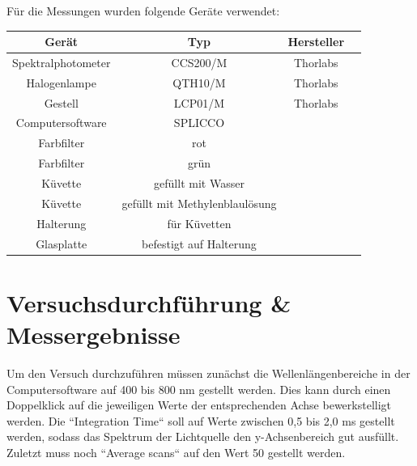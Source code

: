 \documentclass[11pt,ngerman]{scrartcl}
\begin{document}
\noindent Für die Messungen wurden folgende Geräte verwendet:

\begin{table}[H]
	\begin{center}
		\begin{tabular}{|c|c|c|c|} \hline
			\textbf{Gerät}     & \textbf{Typ}                   & \textbf{Hersteller} \\ \hline

			Spektralphotometer & CCS200/M                       & Thorlabs            \\ \hline
			Halogenlampe       & QTH10/M                        & Thorlabs            \\ \hline
			Gestell            & LCP01/M                        & Thorlabs            \\ \hline
			Computersoftware   & SPLICCO                        &                     \\ \hline
			Farbfilter         & rot                            &                     \\ \hline
			Farbfilter         & grün                           &                     \\ \hline
			Küvette            & gefüllt mit Wasser             &                     \\ \hline
			Küvette            & gefüllt mit Methylenblaulösung &                     \\ \hline
			Halterung          & für Küvetten                   &                     \\ \hline
			Glasplatte         & befestigt auf Halterung        &                     \\ \hline
		\end{tabular}
	\end{center}
\end{table}




\section{Versuchsdurchführung \& Messergebnisse}\label{sec:Versuchsdurchführung}

\noindent Um den Versuch durchzuführen müssen zunächst die Wellenlängenbereiche
in der Computersoftware auf 400 bis 800 nm gestellt werden. Dies kann durch
einen Doppelklick auf die jeweiligen Werte der entsprechenden Achse
bewerkstelligt werden. Die ``Integration Time`` soll auf Werte zwischen 0,5 bis
2,0 ms gestellt werden, sodass das Spektrum der Lichtquelle den y-Achsenbereich
gut ausfüllt. Zuletzt muss noch ``Average scans`` auf den Wert 50 gestellt
werden.
\end{document}
